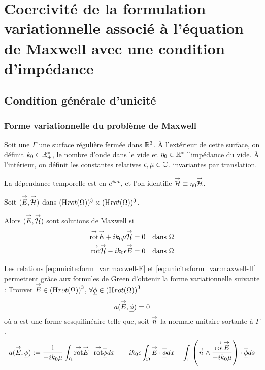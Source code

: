 \section{Coercivité de la formulation variationnelle associé à l'équation de Maxwell avec une condition d'impédance}
\subsection{Condition générale d'unicité}
\subsubsection{Forme variationnelle du problème de Maxwell}

Soit une $\Gamma$ une surface régulière fermée dans $\mathbb R^3$. 
À l'extérieur de cette surface, on définit $k_0 \in \mathbb R_+^*$, le nombre d'onde dans le vide et $\eta_0 \in \mathbb R^*$ l'impédance du vide.
À l'intérieur, on définit les constantes relatives $\epsilon,\mu \in \mathbb C$, invariantes par translation.

\begin{tcolorbox}
\centering
La dépendance temporelle est en $e^{i\omega t}$, et l'on identifie ${\overset{\rightarrow}{\mathcal{H}}} \equiv \eta _0 {\overset{\rightarrow}{\mathcal{H}}}$.
\end{tcolorbox}

Soit $({\overset{\rightarrow}{E}},{\overset{\rightarrow}{\mathcal{H}}})$ dans $(\mathrm{H}_\mathrm{{}}{rot}(\Omega))^3 \times (\mathrm{H}_\mathrm{{}}{rot}(\Omega))^3$. 

Alors $({\overset{\rightarrow}{E}},{\overset{\rightarrow}{\mathcal{H}}})$ sont solutions de Maxwell si 
\begin{align}
\label{eq:unicite:form_var:maxwell-E}
\trot \vE + ik_0 \mu \vH &= 0 && \text{dans $\OO$}
\\\label{eq:unicite:form_var:maxwell-H}
\trot \vH - ik_0\eps \vE &= 0 && \text{dans $\OO$}
  \end{align}

Les relations \eqref{eq:unicite:form_var:maxwell-E} et \eqref{eq:unicite:form_var:maxwell-H} permettent grâce aux formules de Green d'obtenir la forme variationnelle suivante :
Trouver ${\overset{\rightarrow}{E}} \in \left(\mathrm{H}_\mathrm{{}}{rot}(\Omega)\right)^3$, $\forall \underline{\phi} \in \left(\mathrm{H}_\mathrm{{}}{rot}(\Omega)\right)^3$
\[
a({\overset{\rightarrow}{E}},\underline{\phi}) = 0
\]
où a est une forme sesquilinéaire telle que, soit ${\overset{\rightarrow}{n}}$ la normale unitaire sortante à $\Gamma$.
\begin{align*}
a({\overset{\rightarrow}{E}},\underline{\phi}) &:=  \dfrac{1}{-ik_0\mu} \int_\Omega {{\overset{\rightarrow}{\operatorname{rot}}}} {\overset{\rightarrow}{E}} \cdot {{\overset{\rightarrow}{\operatorname{rot}}}} {\overline{\underline{\phi}}} dx + -ik_0\epsilon\int_\Omega{\overset{\rightarrow}{E}}\cdot{\overline{\underline{\phi}}} dx
 - \int_\Gamma \left({\overset{\rightarrow}{n}} \wedge \dfrac{{{\overset{\rightarrow}{\operatorname{rot}}}} {\overset{\rightarrow}{E}}}{-ik_0\mu}\right) \cdot {\overline{\underline{\phi}}} ds \\
 \end{align*}

